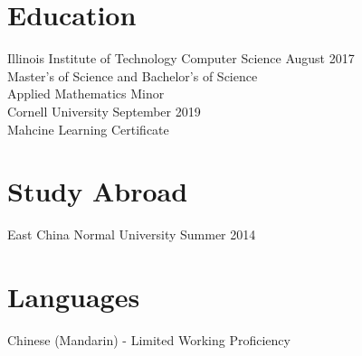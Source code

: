 \documentclass{res}
\begin{document}
\begin{resume}
	\section{\large{Education}}
	Illinois Institute of Technology \hfill
	{\centering Computer Science} 
	 \hfill August 2017 \\
	Master's of Science and Bachelor's of Science \\
	Applied Mathematics Minor \\
	\newline
	\newline
	Cornell University \hfill September 2019 \\
	Mahcine Learning Certificate
	
	\section{\large{Study Abroad}}
	East China Normal University \hfill Summer 2014  
	
	\section{\large{Languages}}
	Chinese (Mandarin) - Limited Working Proficiency
\end{resume}
\end{document}
